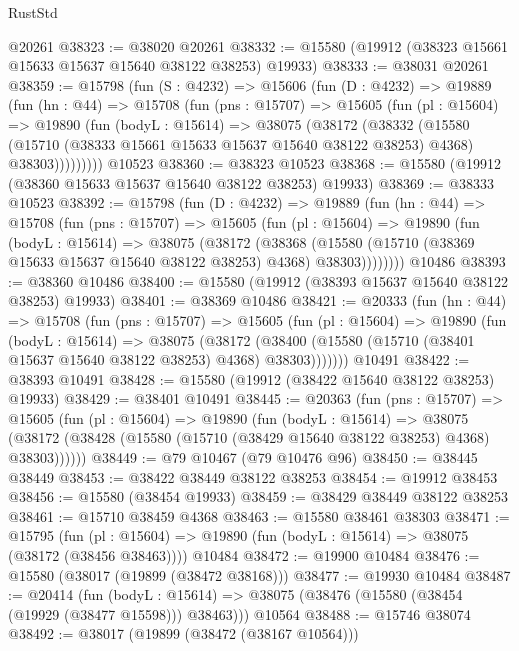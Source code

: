 \begin{lexlean}{RustStd}
\begin{coremodule}
    @20261
@38323 := @38020 @20261
@38332 := @15580 (@19912 (@38323 @15661 @15633 @15637 @15640 @38122 @38253) @19933)
@38333 := @38031 @20261
@38359 := @15798
    (fun (S : @4232) =>
    @15606
      (fun (D : @4232) =>
      @19889
        (fun (hn : @44) =>
        @15708
          (fun (pns : @15707) =>
          @15605
            (fun (pl : @15604) =>
            @19890
              (fun (bodyL : @15614) =>
              @38075
                (@38172
                  (@38332
                    (@15580
                      (@15710 (@38333 @15661 @15633 @15637 @15640 @38122 @38253) @4368)
                      @38303)))))))))
    @10523
@38360 := @38323 @10523
@38368 := @15580 (@19912 (@38360 @15633 @15637 @15640 @38122 @38253) @19933)
@38369 := @38333 @10523
@38392 := @15798
    (fun (D : @4232) =>
    @19889
      (fun (hn : @44) =>
      @15708
        (fun (pns : @15707) =>
        @15605
          (fun (pl : @15604) =>
          @19890
            (fun (bodyL : @15614) =>
            @38075
              (@38172
                (@38368
                  (@15580 (@15710 (@38369 @15633 @15637 @15640 @38122 @38253) @4368) @38303))))))))
    @10486
@38393 := @38360 @10486
@38400 := @15580 (@19912 (@38393 @15637 @15640 @38122 @38253) @19933)
@38401 := @38369 @10486
@38421 := @20333
    (fun (hn : @44) =>
    @15708
      (fun (pns : @15707) =>
      @15605
        (fun (pl : @15604) =>
        @19890
          (fun (bodyL : @15614) =>
          @38075
            (@38172
              (@38400 (@15580 (@15710 (@38401 @15637 @15640 @38122 @38253) @4368) @38303)))))))
    @10491
@38422 := @38393 @10491
@38428 := @15580 (@19912 (@38422 @15640 @38122 @38253) @19933)
@38429 := @38401 @10491
@38445 := @20363
    (fun (pns : @15707) =>
    @15605
      (fun (pl : @15604) =>
      @19890
        (fun (bodyL : @15614) =>
        @38075 (@38172 (@38428 (@15580 (@15710 (@38429 @15640 @38122 @38253) @4368) @38303))))))
@38449 := @79 @10467 (@79 @10476 @96)
@38450 := @38445 @38449
@38453 := @38422 @38449 @38122 @38253
@38454 := @19912 @38453
@38456 := @15580 (@38454 @19933)
@38459 := @38429 @38449 @38122 @38253
@38461 := @15710 @38459 @4368
@38463 := @15580 @38461 @38303
@38471 := @15795
    (fun (pl : @15604) => @19890 (fun (bodyL : @15614) => @38075 (@38172 (@38456 @38463))))
    @10484
@38472 := @19900 @10484
@38476 := @15580 (@38017 (@19899 (@38472 @38168)))
@38477 := @19930 @10484
@38487 := @20414
    (fun (bodyL : @15614) => @38075 (@38476 (@15580 (@38454 (@19929 (@38477 @15598))) @38463)))
    @10564
@38488 := @15746 @38074
@38492 := @38017 (@19899 (@38472 (@38167 @10564)))

\end{coremodule}
\end{lexlean}
